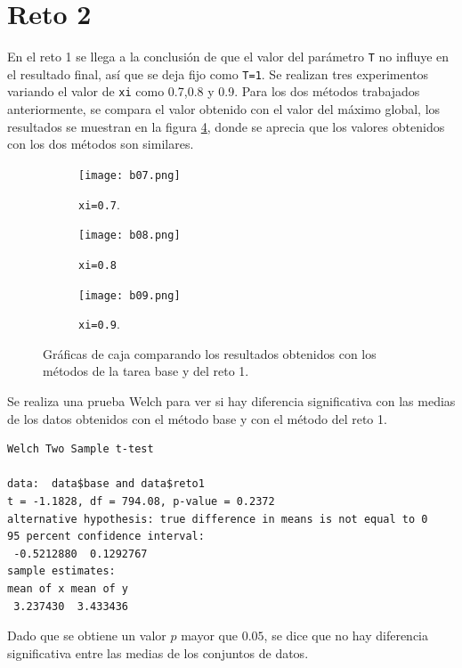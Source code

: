 \documentclass[12pt,letterpaper]{article}
\begin{document}
\section{Reto 2}
En el reto 1 se llega a la conclusión de que el valor del parámetro \texttt{T} no influye en el resultado final, así que se deja fijo como \texttt{T=1}. Se realizan tres experimentos variando el valor de \texttt{xi} como 0.7,0.8 y 0.9. Para los dos métodos trabajados anteriormente, se compara el valor obtenido con el valor del máximo global, los resultados se muestran en la figura \ref{d}, donde se aprecia que los valores obtenidos con los dos métodos son similares.
  \begin{figure}
 	\centering
 	\begin{subfigure}[b]{0.5\linewidth}
 		\texttt{[image: b07.png]}
 		 \caption{\texttt{xi=0.7}.}
 		\label{a}
 	\end{subfigure}
 	\begin{subfigure}[b]{0.5\linewidth}
 		\texttt{[image: b08.png]}
 		 \caption{\texttt{xi=0.8}}
 		\label{b}
 	\end{subfigure}
  	\begin{subfigure}[b]{0.5\linewidth}
 		\texttt{[image: b09.png]}
 		 \caption{\texttt{xi=0.9}.}
 		\label{c}
 	\end{subfigure}

 	\caption{Gráficas de caja comparando los resultados obtenidos con los métodos de la tarea base y del reto 1.}  	
\label{d}
 \end{figure}
 
Se realiza una prueba Welch para ver si hay diferencia significativa con las medias de los datos obtenidos con el método base y con el método del reto 1. 

\begin{verbatim}
Welch Two Sample t-test

data:  data$base and data$reto1
t = -1.1828, df = 794.08, p-value = 0.2372
alternative hypothesis: true difference in means is not equal to 0
95 percent confidence interval:
 -0.5212880  0.1292767
sample estimates:
mean of x mean of y 
 3.237430  3.433436 
\end{verbatim}

Dado que se obtiene un valor $p$ mayor que $0.05$, se dice que no hay diferencia significativa entre las medias de los conjuntos de datos.

 

\end{document}
